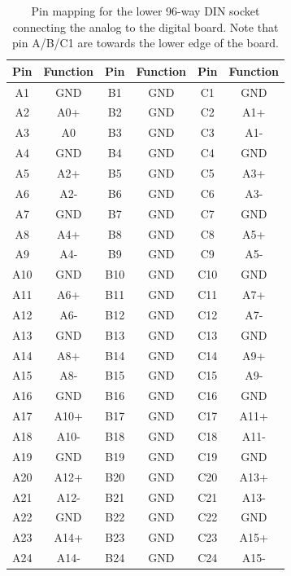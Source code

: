 \documentclass[a4paper]{article}
\begin{document}
\begin{table}[h]
    \begin{center}
        \caption{Pin mapping for the lower 96-way DIN socket connecting the analog to the digital board. Note that pin A/B/C1 are towards the lower edge of the board.}
        \label{tab:DIN96Lower}
        \begin{tabular}{cc|cc|cc}
            \hline
            \hline
            Pin & Function & Pin & Function & Pin & Function \\
            \hline
            A1 & GND & B1 & GND & C1 & GND \\
            A2 & A0+ & B2 & GND & C2 & A1+ \\
            A3 & A0 & B3 & GND & C3 & A1- \\
            A4 & GND & B4 & GND & C4 & GND \\
            A5 & A2+ & B5 & GND & C5 & A3+ \\
            A6 & A2- & B6 & GND & C6 & A3- \\
            A7 & GND & B7 & GND & C7 & GND \\
            A8 & A4+ & B8 & GND & C8 & A5+ \\
            A9 & A4- & B9 & GND & C9 & A5- \\
            A10 & GND & B10 & GND & C10 & GND \\
            A11 & A6+ & B11 & GND & C11 & A7+ \\
            A12 & A6- & B12 & GND & C12 & A7- \\
            A13 & GND & B13 & GND & C13 & GND \\
            A14 & A8+ & B14 & GND & C14 & A9+ \\
            A15 & A8- & B15 & GND & C15 & A9- \\
            A16 & GND & B16 & GND & C16 & GND \\
            A17 & A10+ & B17 & GND & C17 & A11+ \\
            A18 & A10- & B18 & GND & C18 & A11- \\
            A19 & GND & B19 & GND & C19 & GND \\
            A20 & A12+ & B20 & GND & C20 & A13+ \\
            A21 & A12- & B21 & GND & C21 & A13- \\
            A22 & GND & B22 & GND & C22 & GND \\
            A23 & A14+ & B23 & GND & C23 & A15+ \\
            A24 & A14- & B24 & GND & C24 & A15- \\

\end{tabular}
\end{center}
\end{table}
\end{document}
